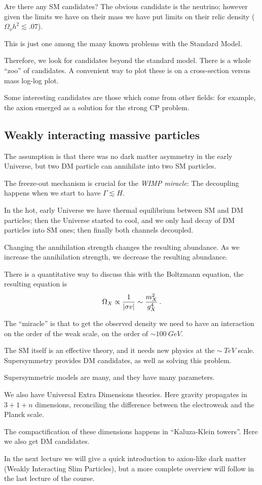 \documentclass[main.tex]{subfiles}
\begin{document}
Are there any SM candidates? 
The obvious candidate is the neutrino; however given the limits we have on their mass 
we have put limits on their relic density (\(\Omega_\nu h^2 \lesssim \num{.07}\)). 

This is just one among the many known problems with the Standard Model. 

Therefore, we look for candidates beyond the standard model. 
There is a whole ``zoo'' of candidates. 
A convenient way to plot these is on a cross-section versus mass log-log plot.

Some interesting candidates are those which come from other fields: 
for example, the axion emerged as a solution for the strong CP problem. 

\subsection{Weakly interacting massive particles}

The assumption is that there was no dark matter asymmetry in the early Universe,
but two DM particle can annihilate into two SM particles. 

The freeze-out mechanism is crucial for the \emph{WIMP miracle}: 
The decoupling happens when we start to have \(\Gamma \lesssim H\). 

In the hot, early Universe we have thermal equilibrium between SM and DM particles;
then the Universe started to cool, and we only had decay of DM particles into SM ones;
then finally both channels decoupled. 

Changing the annihilation strength changes the resulting abundance. 
As we increase the annihilation strength, we decrease the resulting abundance.

There is a quantitative way to discuss this with the Boltzmann equation, the 
resulting equation is 
%
\begin{align}
\Omega_X \propto \frac{1}{\abs{\sigma v}} \sim \frac{m_X^2}{g_X^{4}}
\,.
\end{align}

The ``miracle'' is that to get the observed density we need 
to have an interaction on the order of the weak scale, on the order of 
\(\sim \SI{100}{GeV}\). 

The SM itself is an effective theory, and it needs new physics 
at the \(\sim \SI{}{TeV}\) scale. 
Supersymmetry provides DM candidates, as well as solving this problem. 

Supersymmetric models are many, and they have many parameters. 

We also have Universal Extra Dimensions theories. 
Here gravity propagates in \(3+1+n\) dimensions, reconciling
the difference between the electroweak and the Planck scale. 

The compactification of these dimensions happens in ``Kaluza-Klein towers''.
Here we also get DM candidates.

In the next lecture we will give a quick introduction to axion-like dark matter (Weakly Interacting Slim Particles), but a more complete overview will follow in the last lecture of the course. 

 
\end{document}
